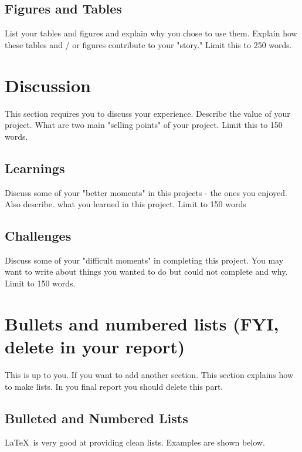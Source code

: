 \documentclass{article}
\begin{document}
\subsection{Figures and Tables}

List your tables and figures and explain why you chose to use them. Explain how these tables and / or figures contribute to your "story." Limit this to 250 words.


\section{Discussion}

This section requires you to discuss your experience. Describe the value of your project. What are two main "selling points" of your project. Limit this to 150 words.

\subsection{Learnings}

Discuss some of your "better moments" in this projects - the ones you enjoyed. Also describe. what you learned in this project. Limit to 150 words

\subsection{Challenges}

Discuss some of your "difficult moments" in completing this project. You may want to write about things you wanted to do but could not complete and why. Limit to 150 words.




\section{Bullets and numbered lists (FYI, delete in your report)}

This is up to you. If you want to add another section. This section explains how to make lists. In you final report you should delete this part. 

\subsection{Bulleted and Numbered Lists}

\LaTeX\ is very good at providing clean lists.  Examples are shown below.
\end{document}
